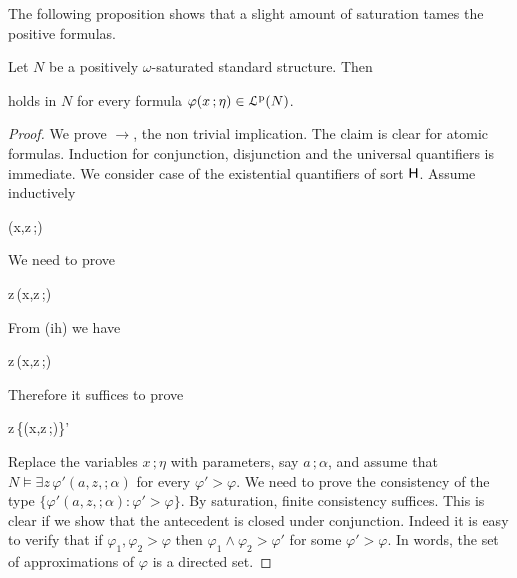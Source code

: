 \documentclass{amsproc}
\begin{document}
The following proposition shows that a slight amount of saturation tames the positive formulas.

\begin{proposition}\label{prop_approx}
  Let $N$ be a positively $\omega$-saturated standard structure.
  Then 
  
  
  holds in $N$ for every formula $\varphi(x\,;\eta)\in{\EuScript L}^{\rm p}(N)$.
\end{proposition}

\begin{proof}
  We prove $\rightarrow$, the non trivial implication.
  The claim is clear for atomic formulas.
  Induction for conjunction, disjunction and the universal quantifiers is immediate.
%
%
%
%
%
  We consider case of the existential quantifiers of sort ${\sf H}$.
  Assume inductively
  
  {\rightarrow}
  {\varphi(x,z\,;\eta)}

  We need to prove

  {\rightarrow}
  {\exists z\,\varphi(x,z\,;\eta)}

  From (ih) we have

  {\rightarrow}
  {\exists z\,\varphi(x,z\,;\eta)}

  Therefore it suffices to prove

  {\rightarrow}
  {\exists z\,\{\varphi(x,z\,;\eta)\}'}

Replace the variables $x\,;\eta$ with parameters, say $a\,;\alpha$, and assume that $N\models\exists z\,\varphi'(a,z,;\alpha)$ for every $\varphi'>\varphi$.
We need to prove the consistency of the type $\{\varphi'(a,z,;\alpha):\varphi'>\varphi\}$.
By saturation, finite consistency suffices.
This is clear if we show that the antecedent is closed under conjunction.
Indeed it is easy to verify that if $\varphi_1,\varphi_2>\varphi$ then $\varphi_1\wedge\varphi_2>\varphi'$ for some $\varphi'>\varphi$.
In words, the set of approximations of $\varphi$ is a directed set.


\end{proof}
\end{document}

